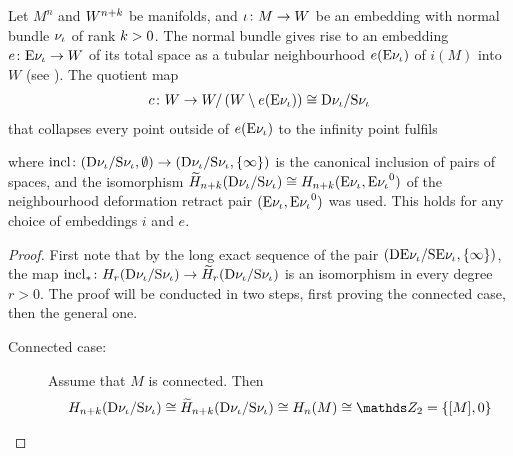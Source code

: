 \begin{Lem}\label{lem:thomisofundcl}
  Let $M^n$ and $W^{n+k}$ be manifolds, and
  ${\iota}\colon M\to W$ be an embedding with
  normal bundle $\nu_{{\iota}}$ of rank $k>0$.
  The normal bundle gives rise to an embedding
  $e\colon \mathrm{E}\nu_{{\iota}}\to W$ of its total space
  as a tubular neighbourhood $e(\mathrm{E}\nu_{{\iota}})$ of $i(M)$ into $W$
  (see \cite[Sec.~15.6]{tomdieck}).
  The quotient map
  \begin{gather*}
    c\colon
     W
    \to  W/\left(  W\setminus e(\mathrm{E}\nu_{{\iota}}) \right)
    \cong \mathrm{D}\nu_{{\iota}}/\mathrm{S}\nu_{{\iota}}
  \end{gather*}
  that collapses every point outside of $e(\mathrm{E}\nu_{{\iota}})$ to the infinity
  point fulfils
  \begin{center}
  \end{center}
  where
  $\mathrm{incl}\colon
  (\mathrm{D}\nu_{{\iota}}/\mathrm{S}\nu_{{\iota}},\emptyset)
  \to(\mathrm{D}\nu_{{\iota}}/\mathrm{S}\nu_{{\iota}}, \{\infty\})$
  is the canonical inclusion of pairs of spaces,
  and the isomorphism
  $\widetilde{H}_{n+k}(\mathrm{D}\nu_{{\iota}}/\mathrm{S}\nu_{{\iota}})
  \cong H_{n+k}(\mathrm{E}\nu_{{\iota}}, {\mathrm{E}\nu_{{\iota}}}^0)$
  of the neighbourhood deformation retract pair
  $(\mathrm{E}\nu_{{\iota}}, {\mathrm{E}\nu_{{\iota}}}^0)$ was used.
  This holds for any choice of embeddings $i$ and $e$.
  \begin{proof}
    First note that by the long exact sequence of the pair 
    $(\mathrm{D}\mathrm{E}\nu_{{\iota}}/\mathrm{S}\mathrm{E}\nu_{{\iota}}, \{\infty\})$, the map
    ${\mathrm{incl}}_*\colon
    H_r(\mathrm{D}\nu_{{\iota}}/\mathrm{S}\nu_{{\iota}})
    \to \widetilde{H}_r(\mathrm{D}\nu_{{\iota}}/\mathrm{S}\nu_{{\iota}})$
    is an isomorphism in every degree $r>0$. The proof will be
    conducted in two steps, first proving the connected case, then
    the general one.
    \begin{description}
    \item[Connected case:]
      Assume that $M$ is connected.
      Then
      \begin{gather*}
        \H_{n+k}(\Thomspace{\N{\emb}})
        \cong\relH_{n+k}(\Thomspace{\N{\emb}})
        \cong \H_n(M) \cong \Zmod2=\{\fundcl M, 0\}

\end{gather*}
\end{description}
\end{proof}
\end{Lem}
